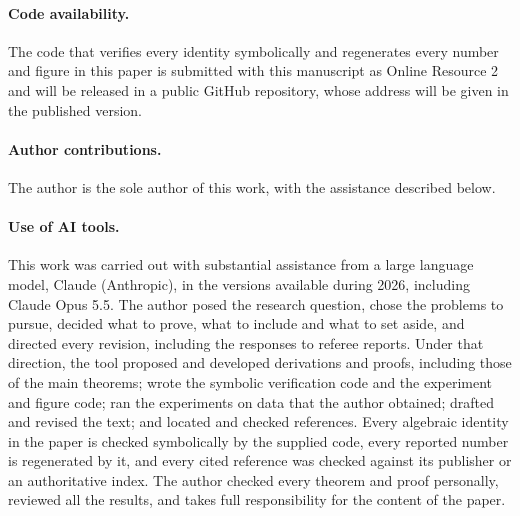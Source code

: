 \documentclass[pdflatex,sn-mathphys-num,iicol]{sn-jnl}
\theoremstyle{thmstyleone}
\theoremstyle{thmstylethree}
\theoremstyle{thmstyletwo}
\begin{document}
\paragraph{Code availability.} The code that verifies every identity symbolically and regenerates every number and figure in this paper is submitted with this manuscript as Online Resource 2 and will be released in a public GitHub repository, whose address will be given in the published version.

\paragraph{Author contributions.} The author is the sole author of this work, with the assistance described below.

\paragraph{Use of AI tools.} This work was carried out with substantial assistance from a large language model, Claude (Anthropic), in the versions available during 2026, including Claude Opus 5.5. The author posed the research question, chose the problems to pursue, decided what to prove, what to include and what to set aside, and directed every revision, including the responses to referee reports. Under that direction, the tool proposed and developed derivations and proofs, including those of the main theorems; wrote the symbolic verification code and the experiment and figure code; ran the experiments on data that the author obtained; drafted and revised the text; and located and checked references. Every algebraic identity in the paper is checked symbolically by the supplied code, every reported number is regenerated by it, and every cited reference was checked against its publisher or an authoritative index. The author checked every theorem and proof personally, reviewed all the results, and takes full responsibility for the content of the paper.


\end{document}
